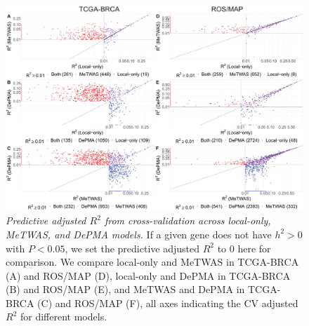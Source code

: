 \begin{figure}[htbp]
	\includegraphics[width = \textwidth]{figures/ch4_fig4.pdf}
	\caption{\emph{Predictive adjusted $R^2$ 
	from cross-validation across
	local-only, MeTWAS, and DePMA
	models.} If a given gene
	does not have $h^2 > 0$
	with $P < 0.05$, we set
	the predictive adjusted $R^2$
	to 0 here for comparison.
	We compare local-only and MeTWAS
	in TCGA-BRCA (A) and ROS/MAP (D),
	local-only and DePMA in TCGA-BRCA (B)
	and ROS/MAP (E), and MeTWAS and DePMA
	in TCGA-BRCA (C) and ROS/MAP (F), all axes indicating the CV
        adjusted $R^2$ for different models.}
	\label{fig:ch4_fig4}
\end{figure}

